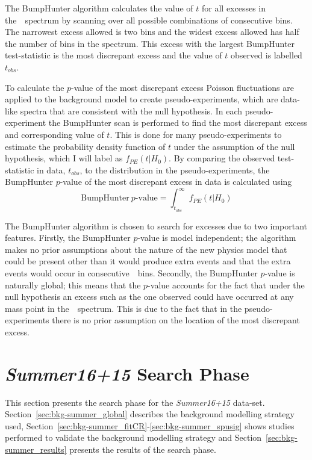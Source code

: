 The BumpHunter algorithm calculates the value of $t$ for all excesses in the~\mjj~spectrum
by scanning over all possible combinations of consecutive bins.
The narrowest excess allowed is two bins and the widest excess allowed has half the number of bins in the spectrum.
This excess with the largest BumpHunter test-statistic is the most discrepant excess and the value of $t$ observed is labelled $t_{obs}$.

To calculate the $p$-value of the most discrepant excess
Poisson fluctuations are applied to the background model to create pseudo-experiments,
which are data-like spectra that are consistent with the null hypothesis.
In each pseudo-experiment the BumpHunter scan is performed to find the most discrepant excess and corresponding value of $t$.
This is done for many pseudo-experiments to estimate the probability density function of $t$ under the assumption of the null hypothesis,
which I will label as $f_{PE}(t| H_0)$.
By comparing the observed test-statistic in data, $t_{obs}$,
to the distribution in the pseudo-experiments,
the BumpHunter $p$-value of the most discrepant excess in data is calculated using
\begin{equation}
  \text{BumpHunter}~p\text{-value} = \int_{t_{obs}}^\infty f_{PE}(t | H_0)
\end{equation}

The BumpHunter algorithm is chosen to search for excesses due to two important features.
Firstly, the BumpHunter $p$-value is model independent;
the algorithm makes no prior assumptions about the nature of the new physics model that could be present
other than it would produce extra events and that the extra events would occur in consecutive~\mjj~bins.
Secondly, the BumpHunter $p$-value is naturally global;
this means that the $p$-value accounts for the fact that under the null hypothesis an excess such as the one observed could have occurred at any mass point in the~\mjj~spectrum.
This is due to the fact that in the pseudo-experiments there is no prior assumption on the location of the most discrepant excess.

\section{\textit{Summer16+15} Search Phase}
\label{sec:bkg-summer}

This section presents the search phase for the \textit{Summer16+15} data-set.
Section~\ref{sec:bkg-summer_global} describes the background modelling strategy used,
Section~\ref{sec:bkg-summer_fitCR}-\ref{sec:bkg-summer_spusig}
shows studies performed to validate the background modelling strategy
and Section~\ref{sec:bkg-summer_results} presents the results of the search phase.

